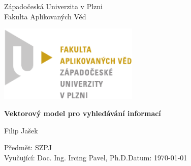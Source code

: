 \begin{titlepage}
    \begin{center}
        \LARGE
        Západočeská Univerzita v Plzni\\
        Fakulta Aplikovaných Věd\\
        
        \vspace{1cm}
        
        \includegraphics[width=0.5\textwidth]{./Graphics/FAV_logo.pdf}
        
        \vspace{4cm}
        
        \textbf{Vektorový model pro vyhledávání informací}
        
        \vspace{0.5cm}
        Filip Jašek
        
    \end{center} 
    \vfill
        \noindent
        \large
        Předmět: SZPJ\\
        Vyučující: Doc. Ing. Ircing Pavel, Ph.D.\hfill Datum: \today
\end{titlepage}